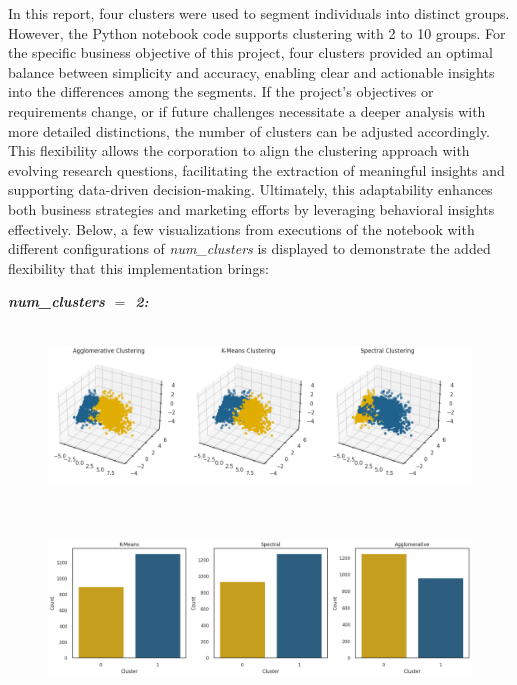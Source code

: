 \documentclass[11pt]{article}
\begin{document}
In this report, four clusters were used to segment individuals into distinct groups. However, the Python notebook code supports clustering with 2 to 10 groups. For the specific business objective of this project, four clusters provided an optimal balance between simplicity and accuracy, enabling clear and actionable insights into the differences among the segments. If the project's objectives or requirements change, or if future challenges necessitate a deeper analysis with more detailed distinctions, the number of clusters can be adjusted accordingly. This flexibility allows the corporation to align the clustering approach with evolving research questions, facilitating the extraction of meaningful insights and supporting data-driven decision-making. Ultimately, this adaptability enhances both business strategies and marketing efforts by leveraging behavioral insights effectively. Below, a few visualizations from executions of the notebook with different configurations of \textit{num\_clusters} is displayed to demonstrate the added flexibility that this implementation brings:

\vspace{1\baselineskip}
\begin{center}
\textbf{\textit{num\_clusters $=$ 2:}}
\end{center}


\vspace{1\baselineskip}
\begin{figure}[H]
\centering
\includegraphics[width=14.41cm,height=4.72cm]{./images/image30.png}
\end{figure}


\vspace{3\baselineskip}
\begin{figure}[H]
\centering
\includegraphics[width=14.06cm,height=4.56cm]{./images/image26.png}
\end{figure}
\end{document}
